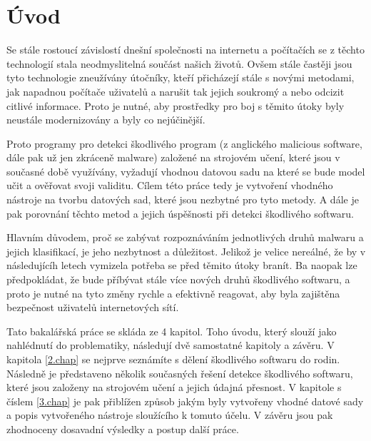 
%

\chapter{Úvod}

Se stále rostoucí závislostí dnešní společnosti na internetu a počítačích se z těchto technologií stala neodmyslitelná součást našich životů. 
Ovšem stále častěji jsou tyto technologie zneužívány útočníky, kteří přicházejí stále s novými metodami, jak napadnou počítače uživatelů a narušit tak jejich soukromý a nebo odcizit citlivé informace.
Proto je nutné, aby prostředky pro boj s těmito útoky byly neustále modernizovány a byly co nejúčinější.

Proto programy pro detekci škodlivého program (z anglického malicious software, dále pak už jen zkráceně malware) založené na strojovém učení, které jsou v současné době využívány, vyžadují vhodnou datovou sadu na které se bude model učit a ověřovat svoji validitu.
Cílem této práce tedy je vytvoření vhodného nástroje na tvorbu datových sad, které jsou nezbytné pro tyto metody. %
A dále je pak porovnání těchto metod a jejich úspěšnosti při detekci škodlivého softwaru.

Hlavním důvodem, proč se zabývat rozpoznáváním jednotlivých druhů malwaru a jejich klasifikací, je jeho nezbytnost a důležitost.
Jelikož je velice nereálné, že by v následujícíh letech vymizela potřeba se před těmito útoky branít. Ba naopak lze předpokládat, že 
bude příbývat stále více nových druhů škodlivého softwaru, a proto je nutné na tyto změny rychle a efektivně reagovat, aby byla zajištěna
bezpečnost uživatelů internetových sítí.

Tato bakalářská práce se skláda ze 4 kapitol. Toho úvodu, který slouží jako nahlédnutí do problematiky, následují dvě samostatné kapitoly a závěru. V kapitola \ref{2.chap} se nejprve seznámíte s dělení škodlivého softwaru do rodin. Následně
je představeno několik současných řešení detekce škodlivého softwaru, které jsou založeny na strojovém učení a jejich údajná přesnost.
V kapitole s číslem \ref{3.chap} je pak přiblížen způsob jakým byly vytvořeny vhodné datové sady a popis vytvořeného nástroje sloužícího k tomuto účelu. V závěru jsou pak zhodnoceny dosavadní výsledky a postup další práce.

